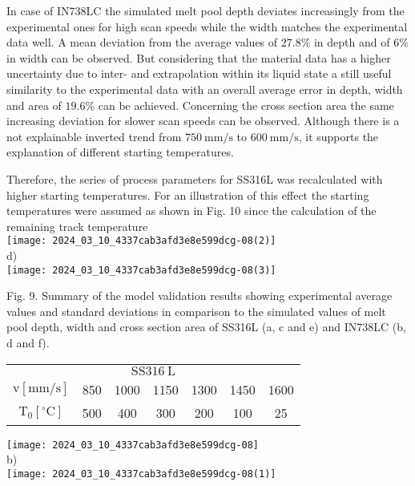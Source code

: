 \documentclass[10pt]{article}
\begin{document}
In case of IN738LC the simulated melt pool depth deviates increasingly from the experimental ones for high scan speeds while the width matches the experimental data well. A mean deviation from the average values of $27.8 \%$ in depth and of $6 \%$ in width can be observed. But considering that the material data has a higher uncertainty due to inter- and extrapolation within its liquid state a still useful similarity to the experimental data with an overall average error in depth, width and area of $19.6 \%$ can be achieved. Concerning the cross section area the same increasing deviation for slower scan speeds can be observed. Although there is a not explainable inverted trend from $750 \mathrm{~mm} / \mathrm{s}$ to $600 \mathrm{~mm} / \mathrm{s}$, it supports the explanation of different starting temperatures.

Therefore, the series of process parameters for SS316L was recalculated with higher starting temperatures. For an illustration of this effect the starting temperatures were assumed as shown in Fig. 10 since the calculation of the remaining track temperature\\
\texttt{[image: 2024\_03\_10\_4337cab3afd3e8e599dcg-08(2)]}\\
d)\\
\texttt{[image: 2024\_03\_10\_4337cab3afd3e8e599dcg-08(3)]}

Fig. 9. Summary of the model validation results showing experimental average values and standard deviations in comparison to the simulated values of melt pool depth, width and cross section area of SS316L (a, c and e) and IN738LC (b, d and f).

\begin{center}
\begin{tabular}{c|cccccc}
\multicolumn{7}{c}{$\mathrm{SS} 316 \mathrm{~L}$} \\
$\mathrm{v}[\mathrm{mm} / \mathrm{s}]$ & 850 & 1000 & 1150 & 1300 & 1450 & 1600 \\
\hline
$\mathrm{T}_{0}\left[{ }^{\circ} \mathrm{C}\right]$ & 500 & 400 & 300 & 200 & 100 & 25 \\
\hline
\end{tabular}
\end{center}

\texttt{[image: 2024\_03\_10\_4337cab3afd3e8e599dcg-08]}\\
b)\\
\texttt{[image: 2024\_03\_10\_4337cab3afd3e8e599dcg-08(1)]}
\end{document}
